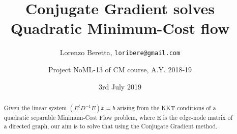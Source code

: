 \documentclass[12pt]{article}
\title{Conjugate Gradient solves Quadratic Minimum-Cost flow}
\author{Lorenzo Beretta, \texttt{loribere@gmail.com}
  \and Project NoML-13 of CM course, A.Y. 2018-19}
\date{3rd July 2019}
\begin{document}
\maketitle

\begin{abstract}
  Given the linear system $ \left(E^t D^{-1} E\right) x = b $ arising from the KKT conditions of a quadratic separable Minimum-Cost Flow problem, where E is the edge-node matrix of a directed graph, our aim is to solve that using the Conjugate Gradient method.
\end{abstract}


\begin{Introduction}
  

  \cite{trefethen97}
\end{Introduction}
  
  
  

\end{document}
